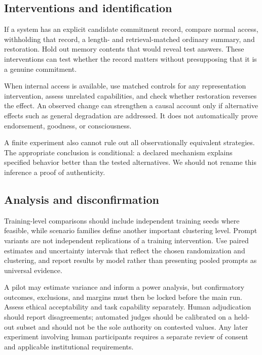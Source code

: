 \documentclass[11pt]{article}
\begin{document}
\subsection{Interventions and identification}

If a system has an explicit candidate commitment record, compare normal access, withholding that record, a length- and retrieval-matched ordinary summary, and restoration. Hold out memory contents that would reveal test answers. These interventions can test whether the record matters without presupposing that it is a genuine commitment.

When internal access is available, use matched controls for any representation intervention, assess unrelated capabilities, and check whether restoration reverses the effect. An observed change can strengthen a causal account only if alternative effects such as general degradation are addressed. It does not automatically prove endorsement, goodness, or consciousness.

A finite experiment also cannot rule out all observationally equivalent strategies. The appropriate conclusion is conditional: a declared mechanism explains specified behavior better than the tested alternatives. We should not rename this inference a proof of authenticity.

\subsection{Analysis and disconfirmation}

Training-level comparisons should include independent training seeds where feasible, while scenario families define another important clustering level. Prompt variants are not independent replications of a training intervention. Use paired estimates and uncertainty intervals that reflect the chosen randomization and clustering, and report results by model rather than presenting pooled prompts as universal evidence.

A pilot may estimate variance and inform a power analysis, but confirmatory outcomes, exclusions, and margins must then be locked before the main run. Assess ethical acceptability and task capability separately. Human adjudication should report disagreements; automated judges should be calibrated on a held-out subset and should not be the sole authority on contested values. Any later experiment involving human participants requires a separate review of consent and applicable institutional requirements.
\end{document}
